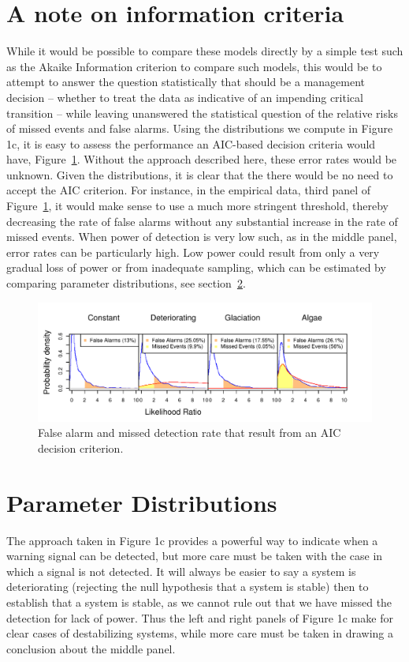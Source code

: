\documentclass[authoryear, preprint,review,12pt]{elsarticle}
\begin{document}
\section{A note on information criteria}\label{aic}
While it would be possible to compare these models directly by a simple test such as the Akaike Information criterion to compare such models, this would be to attempt to answer the question statistically that should be a management decision -- whether to treat the data as indicative of an impending critical transition -- while leaving unanswered the statistical question of the relative risks of missed events and false alarms.  Using the distributions we compute in Figure 1c, it is easy to assess the performance an AIC-based decision criteria would have, Figure~\ref{aic}.  Without the approach described here, these error rates would be unknown.  Given the distributions, it is clear that the there would be no need to accept the AIC criterion.  For instance, in the empirical data, third panel of Figure~\ref{aic}, it would make sense to use a much more stringent threshold, thereby decreasing the rate of false alarms without any substantial increase in the rate of missed events.  When power of detection is very low such, as in the middle panel, error rates can be particularly high.  Low power could result from only a very gradual loss of power or from inadequate sampling, which can be estimated by comparing parameter distributions, see section~\ref{parameterdistributions}.  


\begin{figure}
\begin{center}
\includegraphics[width=\textwidth]{aic.pdf}
\end{center}
\caption{False alarm and missed detection rate that result from an AIC decision criterion.}
\label{fig:aic}
\end{figure}


\section{Parameter Distributions}\label{parameterdistributions}
The approach taken in Figure 1c provides a powerful way to indicate when a warning signal can be detected, but more care must be taken with the case in which a signal is not detected.  It will always be easier to say a system is deteriorating (rejecting the null hypothesis that a system is stable) then to establish that a system is stable, as we cannot rule out that we have missed the detection for lack of power.  Thus the left and right panels of Figure 1c make for clear cases of destabilizing systems, while more care must be taken in drawing a conclusion about the middle panel.    
\end{document}
